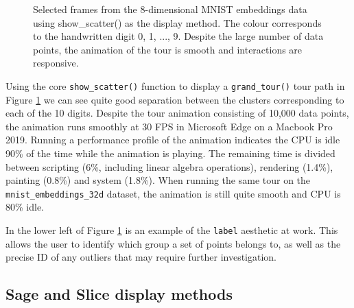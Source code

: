 \begin{figure}
{}

\caption{Selected frames from the 8-dimensional MNIST embeddings data using show\_scatter() as the display method. The colour corresponds to the handwritten digit 0, 1, ..., 9. Despite the large number of data points, the animation of the tour is smooth and interactions are responsive.}\label{fig:mnist-8d-scatter}
\end{figure}

Using the core \texttt{show\_scatter()} function to display a \texttt{grand\_tour()} tour path in Figure \ref{fig:mnist-8d-scatter} we can see quite good separation between the clusters corresponding to each of the 10 digits. Despite the tour animation consisting of 10,000 data points, the animation runs smoothly at 30 FPS in Microsoft Edge on a Macbook Pro 2019. Running a performance profile of the animation indicates the CPU is idle 90\% of the time while the animation is playing. The remaining time is divided between scripting (6\%, including linear algebra operations), rendering (1.4\%), painting (0.8\%) and system (1.8\%). When running the same tour on the \texttt{mnist\_embeddings\_32d} dataset, the animation is still quite smooth and CPU is 80\% idle.

In the lower left of Figure \ref{fig:mnist-8d-scatter} is an example of the \texttt{label} aesthetic at work. This allows the user to identify which group a set of points belongs to, as well as the precise ID of any outliers that may require further investigation.

\hypertarget{sage-and-slice-display-methods}{%
\subsection{Sage and Slice display methods}\label{sage-and-slice-display-methods}}

